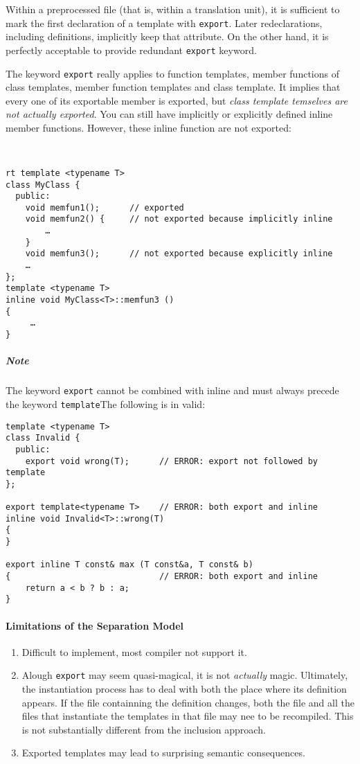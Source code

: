 \documentclass[a4paper,12pt]{book}
\begin{document}
Within a preprocessed file (that is, within a translation unit), it is sufficient to mark the first declaration of a template with \verb|export|. Later redeclarations, including definitions, implicitly keep that attribute. On the other hand, it is perfectly acceptable to provide redundant \verb|export| keyword.

The keyword \verb|export| really applies to function templates, member functions of class templates, member function templates and class template. It implies that every one of its exportable member is exported, but \emph{class template temselves are not actually exported}. You can still have implicitly or explicitly defined inline member functions. However, these inline function are not exported:
\begin{verbatim}


rt template <typename T> 
class MyClass { 
  public: 
    void memfun1();      // exported 
    void memfun2() {     // not exported because implicitly inline 
        … 
    } 
    void memfun3();      // not exported because explicitly inline 
    … 
}; 
template <typename T> 
inline void MyClass<T>::memfun3 () 
{ 
     … 
} 
\end{verbatim}
\subparagraph{Note} The keyword \verb|export| cannot be combined with inline and must always precede the keyword \verb|template|The following is in valid:
\begin{verbatim}
template <typename T> 
class Invalid { 
  public: 
    export void wrong(T);      // ERROR: export not followed by template 
}; 

export template<typename T>    // ERROR: both export and inline 
inline void Invalid<T>::wrong(T) 
{ 
} 

export inline T const& max (T const&a, T const& b) 
{                              // ERROR: both export and inline 
    return a < b ? b : a; 
} 
\end{verbatim}
\paragraph{Limitations of the Separation Model}
\begin{enumerate}
\item Difficult to implement, most compiler not support it.
\item Alough \verb|export| may seem quasi-magical, it is not \emph{actually} magic. Ultimately, the instantiation process has to deal with both the place where its definition appears. If the file containning the definition changes, both the file and all the files that instantiate the templates in that file may nee to be recompiled. This is not substantially different from the inclusion approach.
\item Exported templates may lead to surprising semantic consequences.
\end{enumerate}
\end{document}
